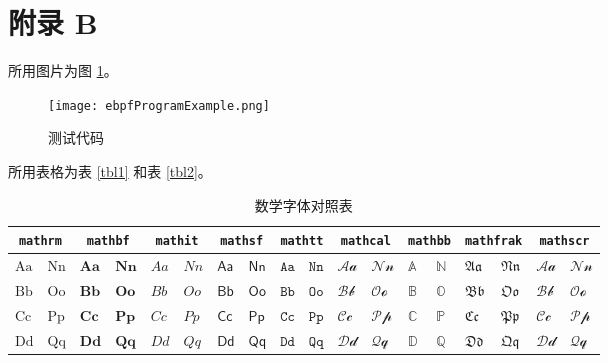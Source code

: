 \section*{附录 B}
    所用图片为图 \ref{fig3}。
    \begin{figure}[htp]
        \centering
        \texttt{[image: ebpfProgramExample.png]} %
        \caption{测试代码}
        \label{fig3}
    \end{figure}

    所用表格为表 \ref{tbl1} 和表 \ref{tbl2}。
    \begin{table*}[htp]
        \centering
        \caption{数学字体对照表}
        \begin{threeparttable}
        \xiaowu
        \begin{tabular}{*{18}{l}}
            \toprule
            \multicolumn{2}{c}{\texttt{mathrm}} & \multicolumn{2}{c}{\texttt{mathbf}} & \multicolumn{2}{c}{\texttt{mathit}} & \multicolumn{2}{c}{\texttt{mathsf}} & \multicolumn{2}{c}{\texttt{mathtt}} & \multicolumn{2}{c}{\texttt{mathcal}} & \multicolumn{2}{c}{\texttt{mathbb}} & \multicolumn{2}{c}{\texttt{mathfrak}} & \multicolumn{2}{c}{\texttt{mathscr}} \\ 
            \midrule
            $\mathrm{Aa}$ & $\mathrm{Nn}$ & $\mathbf{Aa}$ & $\mathbf{Nn}$ & $\mathit{Aa}$ & $\mathit{Nn}$ & $\mathsf{Aa}$ & $\mathsf{Nn}$ & $\mathtt{Aa}$ & $\mathtt{Nn}$ & $\mathcal{Aa}$ & $\mathcal{Nn}$ & $\mathbb{A}$ & $\mathbb{N}$ & $\mathfrak{Aa}$ & $\mathfrak{Nn}$ & $\mathscr{Aa}$ & $\mathscr{Nn}$ \\
            $\mathrm{Bb}$ & $\mathrm{Oo}$ & $\mathbf{Bb}$ & $\mathbf{Oo}$ & $\mathit{Bb}$ & $\mathit{Oo}$ & $\mathsf{Bb}$ & $\mathsf{Oo}$ & $\mathtt{Bb}$ & $\mathtt{Oo}$ & $\mathcal{Bb}$ & $\mathcal{Oo}$ & $\mathbb{B}$ & $\mathbb{O}$ & $\mathfrak{Bb}$ & $\mathfrak{Oo}$ & $\mathscr{Bb}$ & $\mathscr{Oo}$ \\
            $\mathrm{Cc}$ & $\mathrm{Pp}$ & $\mathbf{Cc}$ & $\mathbf{Pp}$ & $\mathit{Cc}$ & $\mathit{Pp}$ & $\mathsf{Cc}$ & $\mathsf{Pp}$ & $\mathtt{Cc}$ & $\mathtt{Pp}$ & $\mathcal{Cc}$ & $\mathcal{Pp}$ & $\mathbb{C}$ & $\mathbb{P}$ & $\mathfrak{Cc}$ & $\mathfrak{Pp}$ & $\mathscr{Cc}$ & $\mathscr{Pp}$ \\
            $\mathrm{Dd}$ & $\mathrm{Qq}$ & $\mathbf{Dd}$ & $\mathbf{Qq}$ & $\mathit{Dd}$ & $\mathit{Qq}$ & $\mathsf{Dd}$ & $\mathsf{Qq}$ & $\mathtt{Dd}$ & $\mathtt{Qq}$ & $\mathcal{Dd}$ & $\mathcal{Qq}$ & $\mathbb{D}$ & $\mathbb{Q}$ & $\mathfrak{Dd}$ & $\mathfrak{Qq}$ & $\mathscr{Dd}$ & $\mathscr{Qq}$ \\

\end{tabular}
\end{threeparttable}
\end{table*}
